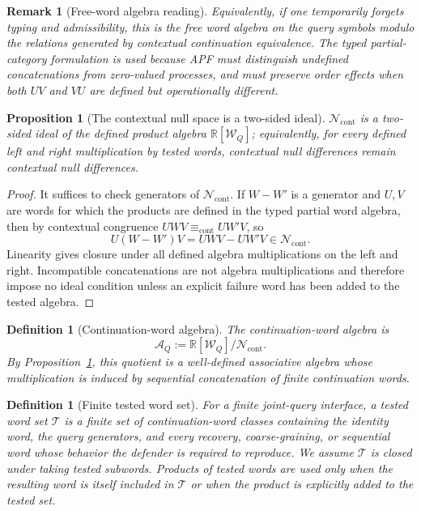 \documentclass[11pt]{article}
\newtheorem{proposition}[theorem]{Proposition}
\newtheorem{definition}[theorem]{Definition}
\newtheorem{remark}[theorem]{Remark}
\begin{document}
\begin{remark}[Free-word algebra reading]\label{rem:free-word-algebra-reading}
Equivalently, if one temporarily forgets typing and admissibility, this is the free word algebra on the query symbols modulo the relations generated by contextual continuation equivalence.  The typed partial-category formulation is used because APF must distinguish undefined concatenations from zero-valued processes, and must preserve order effects when both \(UV\) and \(VU\) are defined but operationally different.
\end{remark}

\begin{proposition}[The contextual null space is a two-sided ideal]\label{prop:null-space-two-sided-ideal}
$\mathcal N_{\mathrm{cont}}$ is a two-sided ideal of the defined product algebra $\mathbb R[\mathcal W_Q]$; equivalently, for every defined left and right multiplication by tested words, contextual null differences remain contextual null differences.
\end{proposition}
\begin{proof}
It suffices to check generators of $\mathcal N_{\mathrm{cont}}$.  If $W-W'$ is a generator and $U,V$ are words for which the products are defined in the typed partial word algebra, then by contextual congruence $UWV\equiv_{\mathrm{cont}}UW'V$, so
\[
 U(W-W')V=UWV-UW'V\in\mathcal N_{\mathrm{cont}}.
\]
Linearity gives closure under all defined algebra multiplications on the left and right.  Incompatible concatenations are not algebra multiplications and therefore impose no ideal condition unless an explicit failure word has been added to the tested algebra.
\end{proof}

\begin{definition}[Continuation-word algebra]
The continuation-word algebra is
\[
 \mathcal A_Q
 :=\mathbb R[\mathcal W_Q] / \mathcal N_{\mathrm{cont}}.
\]
By Proposition~\ref{prop:null-space-two-sided-ideal}, this quotient is a well-defined associative algebra whose multiplication is induced by sequential concatenation of finite continuation words.
\end{definition}

\begin{definition}[Finite tested word set]\label{def:finite-tested-word-set}
For a finite joint-query interface, a \emph{tested word set} $\mathcal T$ is a finite set of continuation-word classes containing the identity word, the query generators, and every recovery, coarse-graining, or sequential word whose behavior the defender is required to reproduce.  We assume $\mathcal T$ is closed under taking tested subwords.  Products of tested words are used only when the resulting word is itself included in $\mathcal T$ or when the product is explicitly added to the tested set.
\end{definition}
\end{document}

